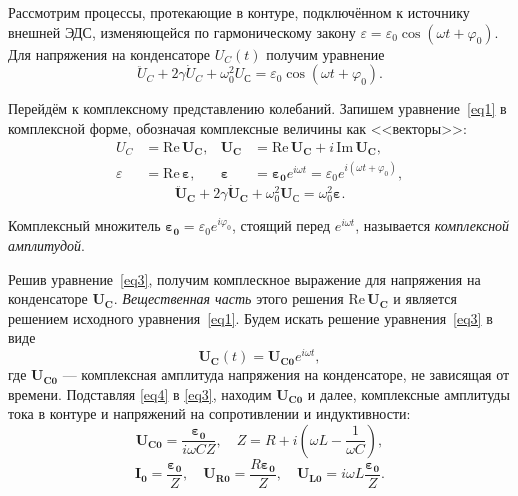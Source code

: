 \documentclass[a4paper, 12pt]{article}
\begin{document}
Рассмотрим процессы, протекающие в контуре, подключённом к источнику внешней ЭДС, изменяющейся по гармоническому закону $\varepsilon = \varepsilon_0 \cos{(\omega t + \varphi_0)}$. Для напряжения на конденсаторе $U_C(t)$ получим уравнение 
\begin{equation}\label{eq1}
\ddot{U}_C + 2\gamma \dot{U}_C + \omega_0^2U_С = \varepsilon_0\cos{(\omega t + \varphi_0)}.
\end{equation}

Перейдём к комплексному представлению колебаний. Запишем уравнение~\eqref{eq1} в комплексной форме, обозначая комплексные величины как <<векторы>>:
\begin{align}\label{eq2}
U_C & = \mathrm{Re}\,\mathbf{U_C}, & \mathbf{U_C} & = \mathrm{Re}\,\mathbf{U_C} + i\,\mathrm{Im}\,\mathbf{U_C}, \\
\varepsilon & = \mathrm{Re}\,\mathbf{\varepsilon}, & \mathbf{\varepsilon} & = \mathbf{\varepsilon_0}e^{i\omega t} = \varepsilon_0e^{i(\omega t + \varphi_0)},
\end{align}
\begin{equation}\label{eq3}
\mathbf{\ddot{U}_C} + 2\gamma \mathbf{\dot{U}_C} + \omega_0^2\mathbf{U_С} = \omega_0^2\mathbf{\varepsilon}.
\end{equation}

Комплексный множитель $\mathbf{\varepsilon_0} = \varepsilon_0e^{i\varphi_0}$, стоящий перед $e^{i\omega t}$, называется \textit{комплексной амплитудой}.

Решив уравнение~\eqref{eq3}, получим комплескное выражение для напряжения на конденсаторе $\mathbf{U_C}$. \textit{Вещественная часть} этого решения $\mathrm{Re}\,\mathbf{U_C}$ и является решением исходного уравнения~\eqref{eq1}. Будем искать решение уравнения~\eqref{eq3} в виде
\begin{equation}\label{eq4}
\mathbf{U_C}(t) = \mathbf{U_{C0}}e^{i\omega t},
\end{equation}
где $\mathbf{U_{C0}}$ --- комплексная амплитуда напряжения на конденсаторе, не зависящая от времени. Подставляя \eqref{eq4} в \eqref{eq3}, находим $\mathbf{U_{C0}}$ и далее, комплексные амплитуды тока в контуре и напряжений на сопротивлении и индуктивности:
\begin{equation}\label{eq5}
\mathbf{U_{C0}} = \frac{\mathbf{\varepsilon_0}}{i\omega CZ}, \quad Z = R + i\left(\omega L - \frac{1}{\omega C}\right),
\end{equation}
\begin{equation}\label{eq6}
\mathbf{I_0} = \frac{\mathbf{\varepsilon_0}}{Z}, \quad \mathbf{U_{R0}} = \frac{R\mathbf{\varepsilon_0}}{Z}, \quad \mathbf{U_{L0}} = i\omega L\frac{\mathbf{\varepsilon_0}}{Z}.
\end{equation}
\end{document}
